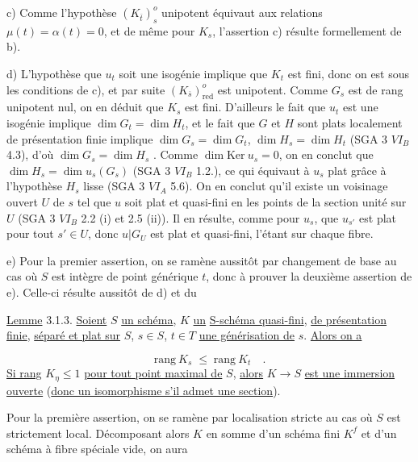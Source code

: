 c)   Comme l'hypothèse $(K_{\overline{t}})^{o}_{s}$ unipotent équivaut aux relations $\mu(t) = \alpha(t) = 0$, et de même pour $K_{s}$, l'assertion c) résulte formellement de b).

d)   L'hypothèse que $u_{t}$ soit une isogénie implique que $K_{t}$ est fini, donc on est sous les conditions de c), et par suite $(K_{\overline{s}})^{o}_{\mathrm{red}}$ est unipotent. Comme $G_{s}$ est de rang unipotent nul, on en déduit que $K_{s}$ est fini. D'ailleurs le fait que $u_{t}$ est une isogénie implique $\dim G_{t} = \dim H_{t}$, et le fait que $G$ et $H$ sont plats localement de présentation finie implique $\dim G_{s} = \dim G_{t}$, $\dim H_{s} = \dim H_{t}$ (SGA 3 $VI_{B}$ 4.3), d'où $\dim G_{s} = \dim H_{s}$ . Comme $\dim \mathrm{Ker}\ u_{s} = 0$, on en conclut que $\dim H_{s} = \dim u_{s}(G_{s})$ (SGA 3 $VI_{B}$ 1.2.), ce qui équivaut à $u_{s}$ plat grâce à l'hypothèse $H_{s}$ lisse (SGA 3 $VI_{A}$ 5.6). On en conclut qu'il existe un voisinage ouvert $U$ de $s$ tel que $u$ soit plat et quasi-fini en les points de la section unité sur $U$ (SGA 3 $VI_{B}$ 2.2 (i) et 2.5 (ii)). Il en résulte, comme pour $u_{s}$, que $u_{s'}$ est plat pour tout $s' \in U$, donc $u|G_{U}$ est plat et quasi-fini, l'étant sur chaque fibre.

e)   Pour la premier assertion, on se ramène aussitôt par changement de base au cas où $S$ est intègre de point générique $t$, donc à prouver la deuxième assertion de e). Celle-ci résulte aussitôt de d) et du



\underline{Lemme} 3.1.3. \underline{Soient} $S$ \underline{un schéma}, $K$ \underline{un} \underline{S-schéma quasi-fini}, \underline{de présentation finie}, \underline{séparé et plat sur} $S$, $s \in S$, $t \in T$ \underline{une générisation de} $s$. \underline{Alors on a}

\begin{equation*}
\mathrm{rang}\ K_{s} \;\leq\; \mathrm{rang}\ K_{t} \quad .
\end{equation*}
\underline{Si rang} $K_{\eta} \leq 1$ \underline{pour tout point maximal de} $S$, \underline{alors} $K \longrightarrow S$ \underline{est une immersion ouverte} (\underline{donc un isomorphisme s'il admet une section}).

Pour la première assertion, on se ramène par localisation stricte au cas où $S$ est strictement local. Décomposant alors $K$ en somme d'un schéma fini $K^{f}$ et d'un schéma à fibre spéciale vide, on aura

